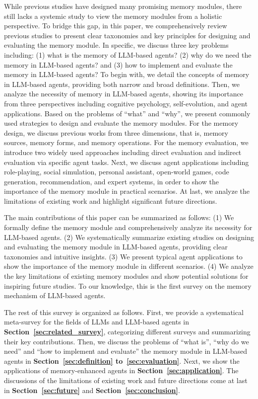 \documentclass{article}
\theoremstyle{definition}
\theoremstyle{theorem}
\theoremstyle{proof}
\theoremstyle{remark}
\begin{document}
	While previous studies have designed many promising memory modules, there still lacks a systemic study to view the memory modules from a holistic perspective.  
	To bridge this gap, in this paper, we comprehensively review previous studies to present clear taxonomies and key principles for designing and evaluating the memory module. 
	In specific, we discuss three key problems including: 
	(1) what is the memory of LLM-based agents?
	(2) why do we need the memory in LLM-based agents? 
	and (3) how to implement and evaluate the memory in LLM-based agents?
	To begin with, we detail the concepts of memory in LLM-based agents, providing both narrow and broad definitions.
	Then, we analyze the necessity of memory in LLM-based agents, showing its importance from three perspectives including cognitive psychology, self-evolution, and agent applications.
	Based on the problems of ``what'' and ``why'', we present commonly used strategies to design and evaluate the memory modules.
	For the memory design, we discuss previous works from three dimensions, that is, memory sources, memory forms, and memory operations.
	For the memory evaluation, we introduce two widely used approaches including direct evaluation and indirect evaluation via specific agent tasks.
	Next, we discuss agent applications including role-playing, social simulation, personal assistant, open-world games, code generation, recommendation, and expert systems, in order to show the importance of the memory module in practical scenarios.    
	At last, we analyze the limitations of existing work and highlight significant future directions.
	
	
	The main contributions of this paper can be summarized as follows:
	(1) We formally define the memory module and comprehensively analyze its necessity for LLM-based agents.
	(2) We systematically summarize existing studies on designing and evaluating the memory module in LLM-based agents, providing clear taxonomies and intuitive insights.
	(3) We present typical agent applications to show the importance of the memory module in different scenarios.    
	(4) We analyze the key limitations of existing memory modules and show potential solutions for inspiring future studies.
	To our knowledge, this is the first survey on the memory mechanism of LLM-based agents.
	
	The rest of this survey is organized as follows. First, we provide a systematical meta-survey for the fields of LLMs and LLM-based agents in \textbf{Section~\ref{sec:related_survey}}, categorizing different surveys and summarizing their key contributions.
	Then, we discuss the problems of ``what is'', ``why do we need'' and ``how to implement and evaluate'' the memory module in LLM-based agents in \textbf{Section~\ref{sec:definition} to~\ref{sec:evaluation}}. Next, we show the applications of memory-enhanced agents in \textbf{Section~\ref{sec:application}}.
	The discussions of the limitations of existing work and future directions come at last in \textbf{Section~\ref{sec:future}} and \textbf{Section~\ref{sec:conclusion}}.
	
\end{document}
